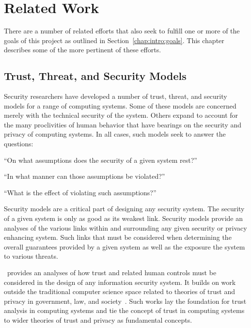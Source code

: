\chapter{Related Work}
\label{chap:related}

There are a number of related efforts that also seek to fulfill one or
more of the goals of this project as outlined in
Section~\ref{chap:intro:goals}. This chapter describes some of the
more pertinent of these efforts.

\section{Trust, Threat, and Security Models}
\label{chap:related:models}

Security researchers have developed a number of trust, threat, and
security models for a range of computing systems. Some of these models
are concerned merely with the technical security of the system. Others
expand to account for the many proclivities of human behavior that
have bearings on the security and privacy of computing systems. In all
cases, such models seek to answer the questions:

\begin{packed_item}
\item ``On what assumptions does the security of a given system rest?''
\item ``In what manner can those assumptions be violated?''
\item ``What is the effect of violating such assumptions?''
\end{packed_item}

Security models are a critical part of designing any security
system. The security of a given system is only as good as its weakest
link. Security models provide an analyses of the various links within
and surrounding any given security or privacy enhancing system.  Such
links that must be considered when determining the overall guarantees
provided by a given system as well as the exposure the system to
various threats.

\cite{flowerday2006}~provides an analyses of how trust and related
human controls must be considered in the design of any information
security system. It builds on work outside the traditional computer
science space related to theories of trust and privacy in government,
law, and society~\cite{camp2003}. Such works lay the foundation for
trust analysis in computing systems and tie the concept of trust in
computing systems to wider theories of trust and privacy as
fundamental concepts.

